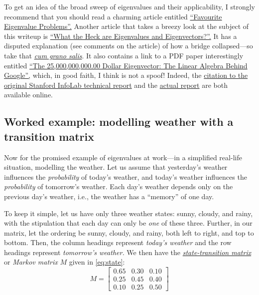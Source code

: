 \documentclass[
  11pt,
  british,
  a4paper,
]{article}
\begin{document}
To get an idea of the broad sweep of eigenvalues and their
applicability, I strongly recommend that you should read a charming
article entitled
\href{http://people.maths.ox.ac.uk/trefethen/dec11.pdf}{``Favourite
Eigenvalue Problems''.} Another article that takes a breezy look at the
subject of this writeup is
\href{http://hubpages.com/education/What-the-Heck-are-Eigenvalues-and-Eigenvectors}{``What
the Heck are Eigenvalues and Eigenvectors?''.} It has a disputed
explanation (see comments on the article) of how a bridge collapsed---so
take that
\href{https://www.thefreedictionary.com/cum+grano+salis}{\emph{cum grano
salis}}. It also contains a link to a PDF paper interestingly entitled
\href{http://www.rose-hulman.edu/~bryan/googleFinalVersionFixed.pdf}{``The
25,000,000,000.00 Dollar Eigenvector: The Linear Algebra Behind
Google'',} which, in good faith, I think is not a spoof! Indeed, the
\href{http://ilpubs.stanford.edu:8090/422/}{citation to the original
Stanford InfoLab technical report} and the
\href{http://ilpubs.stanford.edu:8090/422/1/1999-66.pdf}{actual report}
are both available online.

\hypertarget{worked-example-modelling-weather-with-a-transition-matrix}{%
\subsection{Worked example: modelling weather with a transition
matrix}\label{worked-example-modelling-weather-with-a-transition-matrix}}

Now for the promised example of eigenvalues at work---in a simplified
real-life situation, modelling the weather. Let us assume that
yesterday's weather influences the \emph{probability} of today's
weather, and today's weather influences the \emph{probability} of
tomorrow's weather. Each day's weather depends only on the previous
day's weather, i.e., the weather has a ``memory'' of one day.

To keep it simple, let us have only three weather states: sunny, cloudy,
and rainy, with the stipulation that each day can only be \emph{one} of
these three. Further, in our matrix, let the ordering be sunny, cloudy,
and rainy, both left to right, and top to bottom. Then, the column
headings represent \emph{today's weather} and the row headings represent
\emph{tomorrow's weather.} We then have the
\href{https://en.wikipedia.org/wiki/Stochastic_matrix}{\emph{state-transition
matrix}} or \emph{Markov matrix} \(M\) given in \cref{eq:state}:
\begin{equation}
M = \begin{bmatrix}
0.65 & 0.30 & 0.10\\
0.25 & 0.45 & 0.40\\
0.10 & 0.25 & 0.50
\end{bmatrix}
\label{eq:state}\end{equation}
\end{document}

